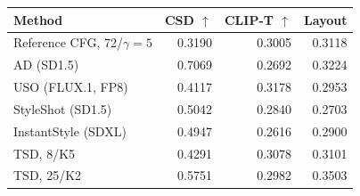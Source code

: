 \begin{tabular}{lrrr}
\toprule
Method & CSD $\uparrow$ & CLIP-T $\uparrow$ & Layout \\
\midrule
Reference CFG, 72/$\gamma=5$ & 0.3190 & 0.3005 & 0.3118 \\
AD (SD1.5) & 0.7069 & 0.2692 & 0.3224 \\
USO (FLUX.1, FP8) & 0.4117 & 0.3178 & 0.2953 \\
StyleShot (SD1.5) & 0.5042 & 0.2840 & 0.2703 \\
InstantStyle (SDXL) & 0.4947 & 0.2616 & 0.2900 \\
TSD, 8/K5 & 0.4291 & 0.3078 & 0.3101 \\
TSD, 25/K2 & 0.5751 & 0.2982 & 0.3503 \\
\bottomrule
\end{tabular}
